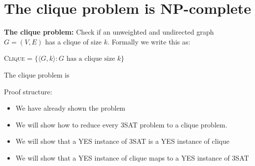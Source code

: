 \documentclass[11  pt]{article}
\begin{document}
%
%
%
%
%
%


	\newpage
	
\section{The clique problem is NP-complete}
\textbf{The clique problem:} Check if an unweighted and undirected graph $G = (V,E)$ has a clique of size $k$. Formally we write this as:

\begin{center}
	\textsc{Clique} = $\{\langle G,k \rangle \colon \text{$G$ has a clique size $k$} \}$\\
\end{center}

\begin{theorem}
	The clique problem is 
\end{theorem}
Proof structure:
\begin{itemize}
	\item We have already shown the problem 
	\item We will show how to reduce every 3SAT problem to a clique problem.
	\item We will show that a YES instance of 3SAT is a YES instance of clique
	\item We will show that a YES instance of clique maps to a YES instance of 3SAT
\end{itemize}
\newpage
\end{document}
